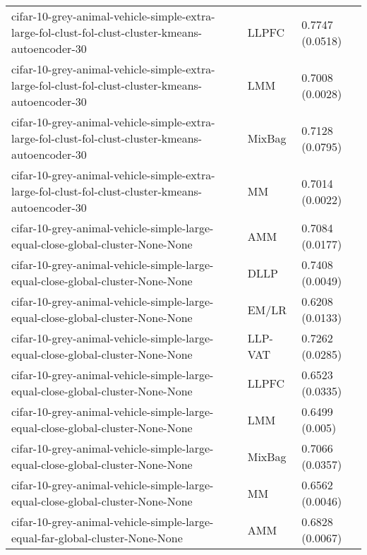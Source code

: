 \begin{longtable}{lll}
            cifar-10-grey-animal-vehicle-simple-extra-large-fol-clust-fol-clust-cluster-kmeans-autoencoder-30 &     LLPFC &                       0.7747 (0.0518) \\
            cifar-10-grey-animal-vehicle-simple-extra-large-fol-clust-fol-clust-cluster-kmeans-autoencoder-30 &       LMM &                       0.7008 (0.0028) \\
            cifar-10-grey-animal-vehicle-simple-extra-large-fol-clust-fol-clust-cluster-kmeans-autoencoder-30 &    MixBag &                       0.7128 (0.0795) \\
            cifar-10-grey-animal-vehicle-simple-extra-large-fol-clust-fol-clust-cluster-kmeans-autoencoder-30 &        MM &                       0.7014 (0.0022) \\
                               cifar-10-grey-animal-vehicle-simple-large-equal-close-global-cluster-None-None &       AMM &                       0.7084 (0.0177) \\
                               cifar-10-grey-animal-vehicle-simple-large-equal-close-global-cluster-None-None &      DLLP &                       0.7408 (0.0049) \\
                               cifar-10-grey-animal-vehicle-simple-large-equal-close-global-cluster-None-None &     EM/LR &                       0.6208 (0.0133) \\
                               cifar-10-grey-animal-vehicle-simple-large-equal-close-global-cluster-None-None &   LLP-VAT &                       0.7262 (0.0285) \\
                               cifar-10-grey-animal-vehicle-simple-large-equal-close-global-cluster-None-None &     LLPFC &                       0.6523 (0.0335) \\
                               cifar-10-grey-animal-vehicle-simple-large-equal-close-global-cluster-None-None &       LMM &                        0.6499 (0.005) \\
                               cifar-10-grey-animal-vehicle-simple-large-equal-close-global-cluster-None-None &    MixBag &                       0.7066 (0.0357) \\
                               cifar-10-grey-animal-vehicle-simple-large-equal-close-global-cluster-None-None &        MM &                       0.6562 (0.0046) \\
                                 cifar-10-grey-animal-vehicle-simple-large-equal-far-global-cluster-None-None &       AMM &                       0.6828 (0.0067) \\

\end{longtable}
